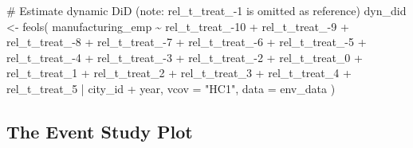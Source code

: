 \documentclass[
  letterpaper,
  DIV=11,
  numbers=noendperiod]{scrreprt}
\newenvironment{Shaded}{\begin{snugshade}}{\end{snugshade}}
\newcommand{\AttributeTok}[1]{\textcolor[rgb]{0.40,0.45,0.13}{#1}}
\newcommand{\CommentTok}[1]{\textcolor[rgb]{0.37,0.37,0.37}{#1}}
\newcommand{\FunctionTok}[1]{\textcolor[rgb]{0.28,0.35,0.67}{#1}}
\newcommand{\NormalTok}[1]{\textcolor[rgb]{0.00,0.23,0.31}{#1}}
\newcommand{\OtherTok}[1]{\textcolor[rgb]{0.00,0.23,0.31}{#1}}
\newcommand{\SpecialCharTok}[1]{\textcolor[rgb]{0.37,0.37,0.37}{#1}}
\newcommand{\StringTok}[1]{\textcolor[rgb]{0.13,0.47,0.30}{#1}}
\begin{document}
\begin{Shaded}
\begin{Highlighting}[]
\CommentTok{\# Estimate dynamic DiD (note: rel\_t\_treat\_{-}1 is omitted as reference)}
\NormalTok{dyn\_did }\OtherTok{\textless{}{-}} \FunctionTok{feols}\NormalTok{(}
\NormalTok{    manufacturing\_emp }\SpecialCharTok{\textasciitilde{}} \StringTok{\textasciigrave{}}\AttributeTok{rel\_t\_treat\_{-}10}\StringTok{\textasciigrave{}} \SpecialCharTok{+} \StringTok{\textasciigrave{}}\AttributeTok{rel\_t\_treat\_{-}9}\StringTok{\textasciigrave{}} \SpecialCharTok{+} \StringTok{\textasciigrave{}}\AttributeTok{rel\_t\_treat\_{-}8}\StringTok{\textasciigrave{}} \SpecialCharTok{+} 
        \StringTok{\textasciigrave{}}\AttributeTok{rel\_t\_treat\_{-}7}\StringTok{\textasciigrave{}} \SpecialCharTok{+} \StringTok{\textasciigrave{}}\AttributeTok{rel\_t\_treat\_{-}6}\StringTok{\textasciigrave{}} \SpecialCharTok{+} \StringTok{\textasciigrave{}}\AttributeTok{rel\_t\_treat\_{-}5}\StringTok{\textasciigrave{}} \SpecialCharTok{+} \StringTok{\textasciigrave{}}\AttributeTok{rel\_t\_treat\_{-}4}\StringTok{\textasciigrave{}} \SpecialCharTok{+} 
        \StringTok{\textasciigrave{}}\AttributeTok{rel\_t\_treat\_{-}3}\StringTok{\textasciigrave{}} \SpecialCharTok{+} \StringTok{\textasciigrave{}}\AttributeTok{rel\_t\_treat\_{-}2}\StringTok{\textasciigrave{}} \SpecialCharTok{+} \StringTok{\textasciigrave{}}\AttributeTok{rel\_t\_treat\_0}\StringTok{\textasciigrave{}} \SpecialCharTok{+} \StringTok{\textasciigrave{}}\AttributeTok{rel\_t\_treat\_1}\StringTok{\textasciigrave{}} \SpecialCharTok{+} 
        \StringTok{\textasciigrave{}}\AttributeTok{rel\_t\_treat\_2}\StringTok{\textasciigrave{}} \SpecialCharTok{+} \StringTok{\textasciigrave{}}\AttributeTok{rel\_t\_treat\_3}\StringTok{\textasciigrave{}} \SpecialCharTok{+} \StringTok{\textasciigrave{}}\AttributeTok{rel\_t\_treat\_4}\StringTok{\textasciigrave{}} \SpecialCharTok{+} \StringTok{\textasciigrave{}}\AttributeTok{rel\_t\_treat\_5}\StringTok{\textasciigrave{}} \SpecialCharTok{|}
\NormalTok{        city\_id }\SpecialCharTok{+}\NormalTok{ year,}
    \AttributeTok{vcov =} \StringTok{"HC1"}\NormalTok{,}
    \AttributeTok{data =}\NormalTok{ env\_data}
\NormalTok{)}
\end{Highlighting}
\end{Shaded}

\subsection{The Event Study Plot}\label{the-event-study-plot}
\end{document}
